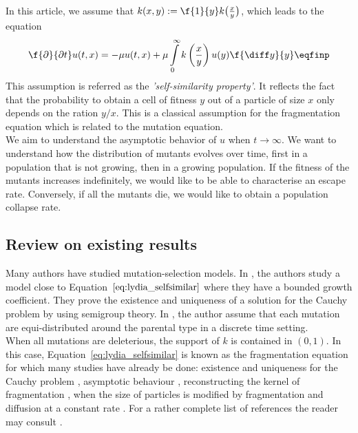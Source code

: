 In this article, we assume that $k(x,y) := \f{1}{y}k \big(\frac{x}{y}\big)$, which leads to the equation
\begin{equation}
    \f{\partial}{\partial t} u(t,x) = - \mu u(t,x) + \mu \int\limits_0^\infty k\left(\frac{x}{y}\right) u(y) \f{\diff y}{y} 
    \eqfinp
    \label{eq:lydia_selfsimilar}
\end{equation}
This assumption is referred as the \textit{'self-similarity property'}. It reflects the fact that the probability to obtain a cell of fitness $y$ out of a particle of size $x$ only depends on the ration $y/x$. This is a classical assumption for the fragmentation equation  which is related to the mutation equation. \\
    
We aim to understand the asymptotic behavior of $u$ when $t \to \infty$. We want to understand how the distribution of mutants evolves over time, first in a population that is not growing, then in a growing population. If the fitness of the mutants increases indefinitely, we would like to be able to characterise an escape rate. Conversely, if all the mutants die, we would like to obtain a population collapse rate. 
    
\subsection{Review on existing results} Many authors have studied mutation-selection models. 
In \cite{burger1996stationary}, the authors study a model close to Equation~$\eqref{eq:lydia_selfsimilar}$ where they have a bounded growth coefficient.  They prove the existence and uniqueness of a solution for the Cauchy problem by using semigroup theory.
In \cite{eshel1972evolution}, the author assume that each mutation are equi-distributed around the parental type in a discrete time setting. \\ 
    
When all mutations are deleterious, the support of $k$ is contained in $(0,1)$. In this case, Equation~\eqref{eq:lydia_selfsimilar} is known as the fragmentation equation for which many studies have already be done: existence and uniqueness for the Cauchy problem \cite{melzak1957scalar}, asymptotic behaviour \cite{doumic2016time}, reconstructing the kernel of fragmentation \cite{hoang2017estimating,hoang2017nonparametric, doumic2018estimating,doumic2021inverse}, when the size of particles is modified by fragmentation and diffusion at a constant rate \cite{laurenccot2022fragmentation}. 
For a rather complete list of references the reader may consult \cite{banasiak2019analytic,bertoin2006random}.
    

